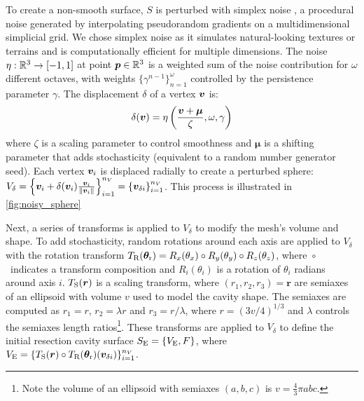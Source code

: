 To create a non-smooth surface, $S$ is perturbed with simplex noise \cite{perlin_improving_2002}, a procedural noise generated by interpolating pseudorandom gradients on a multidimensional simplicial grid.
We chose simplex noise as it simulates natural-looking textures or terrains and is computationally efficient for multiple dimensions.
The noise $\eta : \mathbb{R}^3 \to [-1, 1]$ at point $\bm{p} \in \mathbb{R}^3$ is a weighted sum of the noise contribution for $\omega$ different octaves, with weights $\{\gamma ^ {n - 1}\}_{n = 1}^{\omega}$ controlled by the persistence parameter $\gamma$.
The displacement $\delta$ of a vertex $\bm{v}$ is:
\begin{equation}
  \delta(\bm{v})
  = \eta \left( \frac{\bm{v} + \bm{\mu} }{\zeta}, \omega, \gamma \right)
\end{equation}
where
$\zeta$ is a scaling parameter to control smoothness
and $\bm{\mu}$ is a shifting parameter that adds stochasticity
(equivalent to a random number generator seed).
%
Each vertex $\bm{v}_i$ is displaced radially to create a perturbed sphere:
$
V_{\delta}
  = \left\{
  \bm{v}_i
  + \delta(\bm{v}_i)
  \frac{\bm{v}_i}{\|\bm{v}_i\|}
  \right\}
  _{i = 1}^{n_V}
  = \left\{
  \bm{v}_{\delta i}
  \right\}
  _{i = 1}^{n_V}
$.
This process is illustrated in \cref{fig:noisy_sphere}

Next, a series of transforms is applied to $V_{\delta}$ to modify the mesh's volume and shape.
To add stochasticity, random rotations around each axis are applied to $V_{\delta}$ with the rotation transform
$T_{\text{R}}(\bm{\theta}_{\text{r}}) = R_x(\theta_x) \circ R_y(\theta_y) \circ R_z(\theta_z)$,
where~$\circ$~indicates a transform composition and
$R_i(\theta_i)$ is a rotation of $\theta_i$ radians around axis $i$.
$T_{\text{S}}(\bm{r})$ is a scaling transform,
where $(r_1, r_2, r_3) = \bm{r}$ are semiaxes of an ellipsoid
with volume $v$ used to model the cavity shape.
The semiaxes are computed as
$r_1 = r$, $r_2 = \lambda r$ and $r_3 = r /\lambda$,
where $r = (3 v / 4)^{1/3}$ and
$\lambda$ controls the semiaxes length ratios\footnote{
  Note the volume of an ellipsoid with semiaxes $(a, b, c)$ is $v = \frac{4}{3} \pi a b c$.
}.
These transforms are applied to $V_{\delta}$ to define the initial resection cavity surface $S_{\text{E}} = \{ V_{\text{E}}, F \}$, where
$V_{\text{E}} =
\{
  T_{\text{S}}(\bm{r})
  \circ T_{\text{R}}(\bm{\theta}_{\text{r}})(
    \bm{v}_{\delta i})
\}
_{i = 1}^{n_V}
$.


